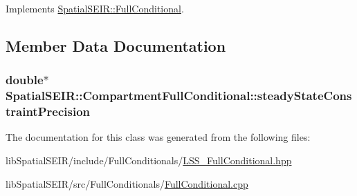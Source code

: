 Implements \hyperlink{classSpatialSEIR_1_1FullConditional_afd84b9273d641028453aefc06b342782}{Spatial\-S\-E\-I\-R\-::\-Full\-Conditional}.



\subsection{Member Data Documentation}
\hypertarget{classSpatialSEIR_1_1CompartmentFullConditional_a9a19cc5df8b83447879ad81ce9f81afe}{
\subsubsection[{steady\-State\-Constraint\-Precision}]{\setlength{\rightskip}{0pt plus 5cm}double$\ast$ Spatial\-S\-E\-I\-R\-::\-Compartment\-Full\-Conditional\-::steady\-State\-Constraint\-Precision}}\label{classSpatialSEIR_1_1CompartmentFullConditional_a9a19cc5df8b83447879ad81ce9f81afe}


The documentation for this class was generated from the following files\-:\begin{DoxyCompactItemize}
\item 
lib\-Spatial\-S\-E\-I\-R/include/\-Full\-Conditionals/\hyperlink{LSS__FullConditional_8hpp}{L\-S\-S\-\_\-\-Full\-Conditional.\-hpp}\item 
lib\-Spatial\-S\-E\-I\-R/src/\-Full\-Conditionals/\hyperlink{FullConditional_8cpp}{Full\-Conditional.\-cpp}\end{DoxyCompactItemize}
